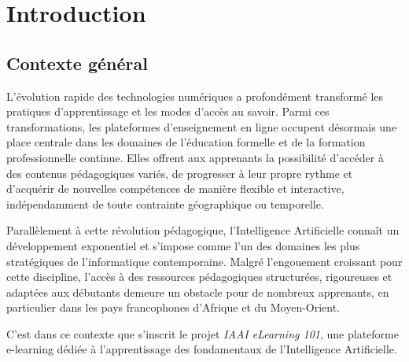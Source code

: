 \documentclass[12pt, a4paper]{report}
\begin{document}
\clearpage
{}
\listoftables

\clearpage
\tableofcontents

\clearpage

\renewcommand{\chaptername}{}
\renewcommand{\thechapter}{\Roman{chapter}}

\chapter{Introduction}

\onehalfspacing

\section{Contexte général}
L'évolution rapide des technologies numériques a profondément transformé les
pratiques d'apprentissage et les modes d'accès au savoir. Parmi ces transformations,
les plateformes d'enseignement en ligne occupent désormais une place centrale dans
les domaines de l'éducation formelle et de la formation professionnelle continue.
Elles offrent aux apprenants la possibilité d'accéder à des contenus pédagogiques
variés, de progresser à leur propre rythme et d'acquérir de nouvelles compétences
de manière flexible et interactive, indépendamment de toute contrainte géographique
ou temporelle.

Parallèlement à cette révolution pédagogique, l'Intelligence Artificielle connaît
un développement exponentiel et s'impose comme l'un des domaines les plus stratégiques
de l'informatique contemporaine. Malgré l'engouement croissant pour cette discipline,
l'accès à des ressources pédagogiques structurées, rigoureuses et adaptées aux
débutants demeure un obstacle pour de nombreux apprenants, en particulier dans les
pays francophones d'Afrique et du Moyen-Orient.

C'est dans ce contexte que s'inscrit le projet \textit{IAAI eLearning 101}, une
plateforme e-learning dédiée à l'apprentissage des fondamentaux de l'Intelligence
Artificielle.
\end{document}
